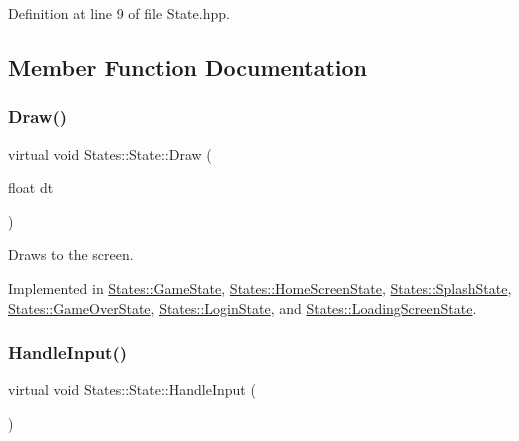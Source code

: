\begin{DoxyVerb}\end{DoxyVerb}
 

Definition at line 9 of file State.\+hpp.



\subsection{Member Function Documentation}
\mbox{\label{class_states_1_1_state_af5faf0a12478e595ec488fa6108fa490}} 
\subsubsection{\texorpdfstring{Draw()}{Draw()}}
{\footnotesize\ttfamily virtual void States\+::\+State\+::\+Draw (\begin{DoxyParamCaption}\item[{float}]{dt }\end{DoxyParamCaption})\hspace{0.3cm}{\ttfamily [pure virtual]}}



Draws to the screen. 

\begin{DoxyVerb}\end{DoxyVerb}
 

Implemented in \mbox{\hyperlink{class_states_1_1_game_state_a56f09cd84928af04b70405bb43511bad}{States\+::\+Game\+State}}, \mbox{\hyperlink{class_states_1_1_home_screen_state_aef921fb2964bf40565ba6fd2efacd3b4}{States\+::\+Home\+Screen\+State}}, \mbox{\hyperlink{class_states_1_1_splash_state_adae0af95808a668cd29b537d7126735f}{States\+::\+Splash\+State}}, \mbox{\hyperlink{class_states_1_1_game_over_state_ac017a6a3acb091ae1596dbf9e5c38643}{States\+::\+Game\+Over\+State}}, \mbox{\hyperlink{class_states_1_1_login_state_aca115316c1aa308f39c6c95c47fd30f6}{States\+::\+Login\+State}}, and \mbox{\hyperlink{class_states_1_1_loading_screen_state_ab59e574f0ccfd3471c7f919df96190a5}{States\+::\+Loading\+Screen\+State}}.

\mbox{\label{class_states_1_1_state_a9f5a1461456ad43c936808c9cfb9e8bd}} 
\subsubsection{\texorpdfstring{HandleInput()}{HandleInput()}}
{\footnotesize\ttfamily virtual void States\+::\+State\+::\+Handle\+Input (\begin{DoxyParamCaption}{ }\end{DoxyParamCaption})\hspace{0.3cm}{\ttfamily [pure virtual]}}



